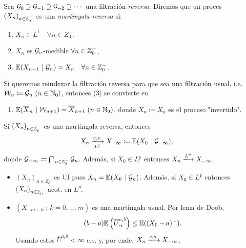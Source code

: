 \begin{definition}
	Sea $\mathcal{G}_{0} \supseteq \mathcal{G}_{-1} \supseteq \mathcal{G}_{-2} \supseteq \cdots$ una filtración \textit{reversa}. Diremos que un proces $(X_{n})_{n \in \mathbb{Z}_{0}^{-}}$ es una \textit{martingala reversa} si:
	\begin{enumerate}
		\item $X_{n} \in L^{1} \quad \forall n \in Z_{0}^{-}$,

		\item $X_{n}$ es $\mathcal{G}_{n}$-medible $\forall n \in \mathbb{Z}_{0}^{-}$,

		\item $\mathbb{E}(X_{n+1} \ | \ \mathcal{G}_{n}) = X_{n} \quad \forall n \in \mathbb{Z}_{0}^{-}$.
	\end{enumerate}
	Si queremos reindexar la filtración reversa para que sea una filtración usual, i.e. $\mathcal{W}_{n} \coloneq \mathcal{G}_{n} \ (n \in \mathbb{N}_{0})$, entonces (3) se convierte en
	\begin{enumerate}
		\item[3'.] $\mbb{E}(\overline{X}_{n} \ | \ \mcal{W}_{n + 1}) = \overline{X}_{n+1} \ (n \in \N_{0})$, donde $\overline{X}_{n} \coloneq X_{n}$ es el proceso "invertido".
	\end{enumerate}
\end{definition}

\begin{theorem}
	Si $(X_{n})_{n \in \mathbb{Z}_{0}^{-}}$ es una martingala reversa, entonces
	\[ X_{n} \xlongrightarrow[L^{1}]{c.s.} X_{-\infty} \coloneq \mbb{E}(X_{0} \ | \ \mcal{G}_{-\infty}), \]
	donde $\mathcal{G}_{-\infty} \coloneq \bigcap_{n \in \mathbb{Z}_{0}^{-}} \mathcal{G}_{n}$. Además, si $X_{0} \in L^{p}$ entonces $X_{n} \xlongrightarrow{L^{p}} X_{-\infty}$.
\end{theorem}

\begin{idea}
	\begin{itemize}
		\item $(X_{n})_{n \in Z_{0}^{-}}$ es UI pues $X_{n} = \mbb{E}(X_{0} \ | \ \mcal{G}_{n})$. Además, si $X_{0} \in L^{p}$ entonces $(X_{n})_{n \in \mathbb{Z}_{0}^{-}}$ acot. en $L^{p}$.

		\item $(X_{-m + k} \ : \ k = 0,\dots,m)$ es una martingala usual. Por lema de Doob,
		\[ (b-a) \mathbb{E}\left( \overline{U}_{n}^{a,b} \right) \leq \mathbb{E}((X_{0} - a)^{-}). \]
		Usando estos $\overline{U}^{a,b} < \infty$ c.s. y, por ende, $X_{n} \xlongrightarrow{c.s.} X_{-\infty}$.
	\end{itemize}
\end{idea}
